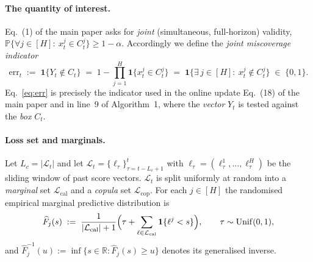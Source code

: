 \documentclass[11pt]{article}
\theoremstyle{definition}
\theoremstyle{remark}
\newcommand{\R}{\mathbb{R}}
\newcommand{\PR}{\mathbb{P}}
\newcommand{\ind}{\mathbf{1}}
\newcommand{\Lcal}{\mathcal{L}_{\mathrm{cal}}}
\newcommand{\Lcop}{\mathcal{L}_{\mathrm{cop}}}
\newcommand{\err}{\mathrm{err}}
\newcommand{\horizon}{[H]}
\begin{document}
\paragraph{The quantity of interest.}
Eq.~(1) of the main paper asks for \emph{joint} (simultaneous, full-horizon)
validity, $\PR\{\forall j\in\horizon:\ x_t^{j}\in C_t^{j}\}\ge 1-\alpha$.
Accordingly we define the \emph{joint miscoverage indicator}
\begin{equation}
  \err_t
  \;:=\;\ind\{Y_t\notin C_t\}
  \;=\;1-\prod_{j=1}^{H}\ind\bigl\{x_t^{j}\in C_t^{j}\bigr\}
  \;=\;\ind\bigl\{\exists\, j\in\horizon:\ x_t^{j}\notin C_t^{j}\bigr\}
  \;\in\;\{0,1\}.
  \label{eq:err}
\end{equation}
Eq.~\eqref{eq:err} is precisely the indicator used in the online update
Eq.~(18) of the main paper and in line~9 of Algorithm~1, where the
\emph{vector} $Y_t$ is tested against the \emph{box} $C_t$.

\paragraph{Loss set and marginals.}
Let $L_c=|\mathcal{L}_t|$ and let
$\mathcal{L}_t=\{\ell_\tau\}_{\tau=t-L_c+1}^{t}$ with
$\ell_\tau=(\ell_\tau^{1},\dots,\ell_\tau^{H})$ be the sliding window of past
score vectors. $\mathcal{L}_t$ is split uniformly at random into a
\emph{marginal} set $\Lcal$ and a \emph{copula} set $\Lcop$. For each
$j\in\horizon$ the randomised empirical marginal predictive distribution is
\begin{equation}
  \widehat{F}_j(s)
  \;:=\;\frac{1}{|\Lcal|+1}
  \Bigl(\tau+\sum_{\ell\in\Lcal}\ind\{\ell^{j}<s\}\Bigr),
  \qquad \tau\sim\mathrm{Unif}(0,1),
  \label{eq:cdf}
\end{equation}
and $\widehat{F}_j^{-1}(u):=\inf\{s\in\R:\widehat{F}_j(s)\ge u\}$ denotes its
generalised inverse.
\end{document}
